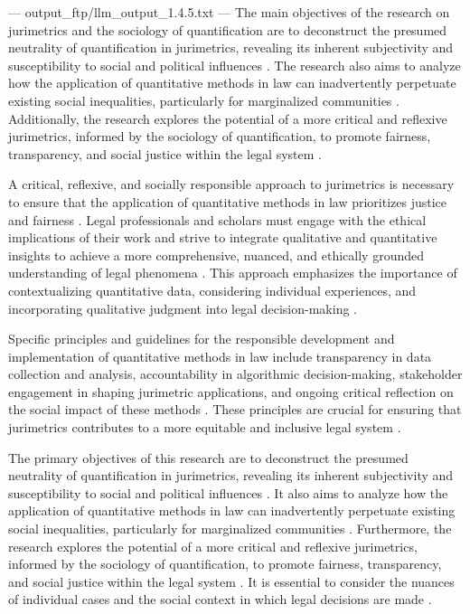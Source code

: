 ---
output_ftp/llm_output_1.4.5.txt
---
The main objectives of the research on jurimetrics and the sociology of quantification are to deconstruct the presumed neutrality of quantification in jurimetrics, revealing its inherent subjectivity and susceptibility to social and political influences \cite{10.1590/data.2022.65.3.267,10.1080/07329113.2015.1046739}. The research also aims to analyze how the application of quantitative methods in law can inadvertently perpetuate existing social inequalities, particularly for marginalized communities \cite{10.1590/data.2022.65.3.267,10.1080/07329113.2015.1046739}. Additionally, the research explores the potential of a more critical and reflexive jurimetrics, informed by the sociology of quantification, to promote fairness, transparency, and social justice within the legal system \cite{10.1590/data.2022.65.3.267,10.1080/07329113.2015.1046739}.

A critical, reflexive, and socially responsible approach to jurimetrics is necessary to ensure that the application of quantitative methods in law prioritizes justice and fairness \cite{10.1007/s11186-021-09453-1,unger2021process}. Legal professionals and scholars must engage with the ethical implications of their work and strive to integrate qualitative and quantitative insights to achieve a more comprehensive, nuanced, and ethically grounded understanding of legal phenomena \cite{10.1007/s11186-021-09453-1,unger2021process}. This approach emphasizes the importance of contextualizing quantitative data, considering individual experiences, and incorporating qualitative judgment into legal decision-making \cite{10.1007/s11186-021-09453-1,unger2021process}.

Specific principles and guidelines for the responsible development and implementation of quantitative methods in law include transparency in data collection and analysis, accountability in algorithmic decision-making, stakeholder engagement in shaping jurimetric applications, and ongoing critical reflection on the social impact of these methods \cite{10.1007/s11186-021-09453-1,unger2021process}. These principles are crucial for ensuring that jurimetrics contributes to a more equitable and inclusive legal system \cite{10.1007/s11186-021-09453-1,unger2021process}.

The primary objectives of this research are to deconstruct the presumed neutrality of quantification in jurimetrics, revealing its inherent subjectivity and susceptibility to social and political influences \cite{10.1590/data.2022.65.3.267,10.5040/9781350220645}. It also aims to analyze how the application of quantitative methods in law can inadvertently perpetuate existing social inequalities, particularly for marginalized communities \cite{10.1057/s41599-020-00557-0,10.1590/data.2022.65.3.267}. Furthermore, the research explores the potential of a more critical and reflexive jurimetrics, informed by the sociology of quantification, to promote fairness, transparency, and social justice within the legal system \cite{10.1590/data.2022.65.3.267,10.5040/9781350220645}. It is essential to consider the nuances of individual cases and the social context in which legal decisions are made \cite{10.1590/data.2022.65.3.267,10.1080/07329113.2015.1046739}.


